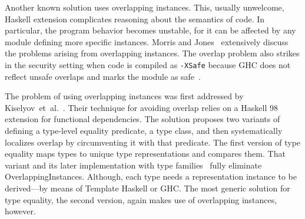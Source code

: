 \documentclass[runningheads]{llncs}
\newcommand{\K}[1]{\lstinline[style=fancy]{#1}}
\begin{document}
Another known solution uses overlapping instances. This, usually unwelcome, Haskell extension complicates reasoning about the semantics of code. In particular, the program behavior becomes unstable, for it can be affected by any module defining more specific instances. Morris and Jones~\cite{Morris2010} extensively discuss the problems arising from overlapping instances.
The overlap problem also strikes in the security setting when code is compiled as \K{-XSafe} because GHC does not reflect unsafe overlaps and marks the module as safe~\cite{sh-overlapping}.

The problem of using overlapping instances was first addressed by Kiselyov~et~al.~\cite{Kiselyov2004}. Their technique for avoiding overlap relies on a Haskell 98 extension for functional dependencies. The solution proposes two variants of defining a type-level equality predicate, a type class, and then systematically localizes overlap by circumventing it with that predicate. The first version of type equality maps types to unique type representations and compares them. That variant and its later implementation with type families~\cite{Kiselyov2012} fully eliminate \textsf{OverlappingInstances}. Although, each type needs a representation instance to be derived---by means of Template Haskell or GHC. The most generic solution for type equality, the second version, again makes use of overlapping instances, however.
\end{document}

